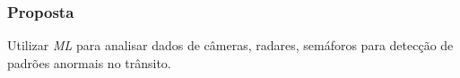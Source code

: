 \begin{frame}
	\frametitle{Proposta}
	Utilizar \textit{ML} para analisar dados de câmeras, 
	radares, semáforos para detecção de padrões anormais no trânsito.
\end{frame}
